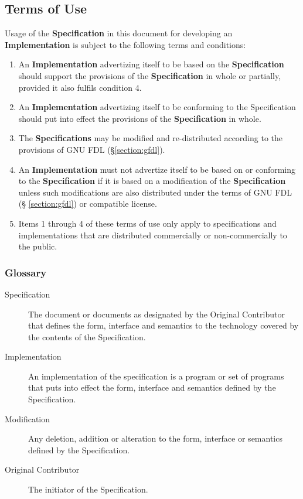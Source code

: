 \documentclass[a4paper]{article}
\begin{document}
\subsection{Terms of Use}
Usage of the \textbf{Specification} in this document for developing an
\textbf{Implementation} is subject to the following terms and conditions:
\begin{enumerate}
\item An \textbf{Implementation} advertizing itself to be based on the
  \textbf{Specification} should support the provisions of the
  \textbf{Specification} in whole or partially, provided it also
  fulfils condition 4.
\item An \textbf{Implementation} advertizing itself to be conforming
  to the Specification should put into effect the provisions of the
  \textbf{Specification} in whole.
\item The \textbf{Specifications} may be modified and re-distributed
  according to the provisions of GNU FDL (\S \ref{section:gfdl}).
\item An \textbf{Implementation} must not advertize itself to be based
  on or conforming to the \textbf{Specification} if it is based on a
  modification of the \textbf{Specification} unless such modifications
  are also distributed under the terms of GNU FDL (\S
  \ref{section:gfdl}) or compatible license.
\item Items 1 through 4 of these terms of use only apply to
  specifications and implementations that are distributed commercially
  or non-commercially to the public.
\end{enumerate}

\subsubsection*{Glossary}
\begin{description}
\item [Specification] The document or documents as designated by the
  Original Contributor that defines the form, interface and semantics
  to the technology covered by the contents of the Specification.
\item [Implementation] An implementation of the specification is a
  program or set of programs that puts into effect the form, interface
  and semantics defined by the Specification.
\item [Modification] Any deletion, addition or alteration to the form,
  interface or semantics defined by the Specification.
\item [Original Contributor] The initiator of the Specification.
\end{description}
\end{document}
